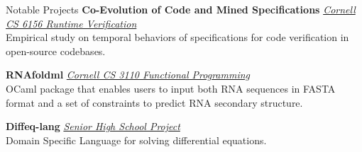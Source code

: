  
\begin{rSection}{Notable Projects}
	\textbf{Co-Evolution of Code and Mined Specifications} \href{https://github.com/zwt299/spec-miners}{\textit{Cornell CS 6156 Runtime Verification} \ExternalLink} \\
	Empirical study on temporal behaviors of specifications for code verification in open-source codebases.

	\textbf{RNAfoldml} \href{https://github.com/jpVinnie/RNAfoldml/}{\textit{Cornell CS 3110 Functional Programming} \ExternalLink} \\
	OCaml package that enables users to input both RNA sequences in FASTA format and a set of constraints to predict RNA secondary structure.

	\textbf{Diffeq-lang} \href{https://github.com/jpVinnie/diffeq-lang/}{\textit{Senior High School Project} \ExternalLink} \\
	Domain Specific Language for solving differential equations.

\end{rSection}